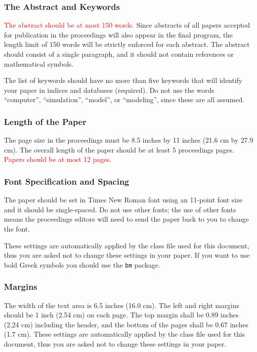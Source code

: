 \documentclass{scspaperproc}
\theoremstyle{scsthe}
\begin{document}
\subsubsection{The Abstract and Keywords}
\textcolor{red}{The abstract should be at most 150 words.} Since abstracts of all papers accepted for publication in the proceedings will also appear in the final program, the length limit of 150 words will be strictly enforced for each abstract. The abstract should consist of a single paragraph, and it should not contain references or mathematical symbols. 

The list of keywords should have no more than five keywords that will identify your paper in indices and databases (required). Do not use the words “computer”, “simulation”, “model”, or “modeling”, since these are all assumed.

\subsubsection{Length of the Paper}
The page size in the proceedings must be 8.5 inches by 11 inches (21.6 cm by 27.9 cm). The overall length of the paper should be at least 5 proceedings pages. \textcolor{red}{Papers should be at most 12 pages}.

\subsubsection{Font Specification and Spacing}
The paper should be set in Times New Roman font using an 11-point font size and it should be single-spaced. Do not use other fonts; the use of other fonts means the proceedings editors will need to send the paper back to you to change the font.

These settings are automatically applied by the class file used for this document, thus you are asked not to change these settings in your paper. If you want to use bold Greek symbols you should use the \texttt{bm} package.

\subsubsection{Margins}
\label{sec:margins}

The width of the text area is 6.5 inches (16.0 cm). The left and right margins should be 1 inch (2.54 cm) on each page. The top margin shall be 0.89 inches (2,24 cm) including the header, and the bottom of the pages shall be 0.67 inches (1.7 cm). These settings are automatically applied by the class file used for this document, thus you are asked not to change these settings in your paper.
\end{document}
